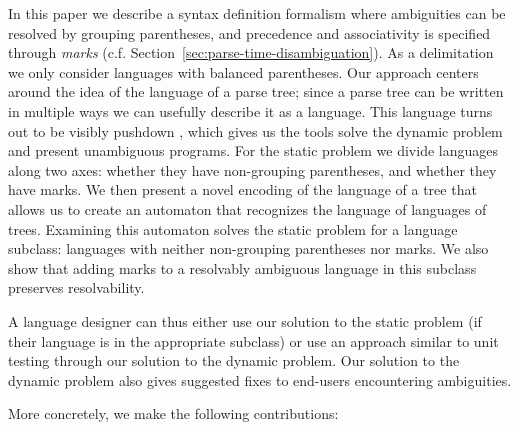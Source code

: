 \documentclass[runningheads]{llncs}
\begin{document}
In this paper we describe a syntax definition formalism where ambiguities can be resolved by grouping parentheses, and precedence and associativity is specified through \emph{marks} (c.f. Section~\ref{sec:parse-time-disambiguation}). As a delimitation we only consider languages with balanced parentheses. Our approach centers around the idea of the language of a parse tree; since a parse tree can be written in multiple ways we can usefully describe it as a language. This language turns out to be visibly pushdown \cite{alurVisiblyPushdownLanguages2004}, which gives us the tools solve the dynamic problem and present unambiguous programs. For the static problem we divide languages along two axes: whether they have non-grouping parentheses, and whether they have marks. We then present a novel encoding of the language of a tree that allows us to create an automaton that recognizes the language of languages of trees. Examining this automaton solves the static problem for a language subclass: languages with neither non-grouping parentheses nor marks. We also show that adding marks to a resolvably ambiguous language in this subclass preserves resolvability.

A language designer can thus either use our solution to the static problem (if their language is in the appropriate subclass) or use an approach similar to unit testing through our solution to the dynamic problem. Our solution to the dynamic problem also gives suggested fixes to end-users encountering ambiguities.

More concretely, we make the following contributions:
\end{document}
